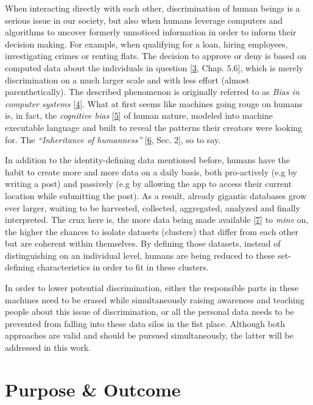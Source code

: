 \documentclass[12pt,english,a4paper,titlepage,cleardoublepage=empty,dottedtoc]{report}
\begin{document}
When interacting directly with each other, discrimination of human
beings is a serious issue in our society, but also when humans leverage
computers and algorithms to uncover formerly unnoticed information in
order to inform their decision making. For example, when qualifying for
a loan, hiring employees, investigating crimes or renting flats. The
decision to approve or deny is based on computed data about the
individuals in question
{[}\protect\hyperlink{ref-book_2015_ethical-it-innovation}{3}, Chap.
5.6{]}, which is merely discrimination on a much larger scale and with
less effort (almost parenthetically). The described phenomenon is
originally referred to as \emph{Bias in computer systems}
{[}\protect\hyperlink{ref-paper_1996_bias-in-computer-systems}{4}{]}.
What at first seems like machines going rouge on humans is, in fact, the
\emph{cognitive bias}
{[}\protect\hyperlink{ref-wikipedia_2016_cognitive-bias}{5}{]} of human
nature, modeled into machine executable language and built to reveal the
patterns their creators were looking for. The \emph{``Inheritance of
humanness''} {[}\protect\hyperlink{ref-web_2016_big-data-is-people}{6},
Sec. 2{]}, so to say.

In addition to the identity-defining data mentioned before, humans have
the habit to create more and more data on a daily basis, both
pro-actively (e.g by writing a post) and passively (e.g by allowing the
app to access their current location while submitting the post). As a
result, already gigantic databases grow ever larger, waiting to be
harvested, collected, aggregated, analyzed and finally interpreted. The
crux here is, the more data being made available
{[}\protect\hyperlink{ref-video_2015_big-data-and-deep-learning_discrimination}{7}{]}
to \emph{mine} on, the higher the chances to isolate datasets (clusters)
that differ from each other but are coherent within themselves. By
defining those datasets, instead of distinguishing on an individual
level, humans are being reduced to these set-defining characteristics in
order to fit in these clusters.

In order to lower potential discrimination, either the responsible parts
in these machines need to be erased while simultaneously raising
awareness and teaching people about this issue of discrimination, or all
the personal data needs to be prevented from falling into these data
silos in the fist place. Although both approaches are valid and should
be pursued simultaneously, the latter will be addressed in this work.

\section{Purpose \& Outcome}\label{purpose-outcome}
\end{document}
